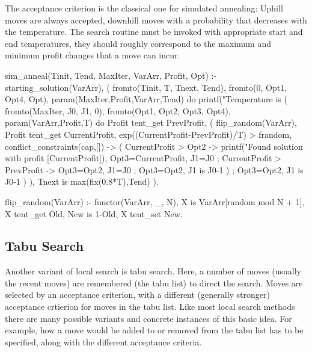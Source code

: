 The acceptance criterion is the classical one for simulated annealing:
Uphill moves are always accepted, downhill moves with a probability
that decreases with the temperature. The search routine must be invoked
with appropriate start and end temperatures, they should roughly correspond
to the maximum and minimum profit changes that a move can incur.
{\small
\begin{code}
sim_anneal(Tinit, Tend, MaxIter, VarArr, Profit, Opt) :-
        starting_solution(VarArr),              %
        (   fromto(Tinit, T, Tnext, Tend),
            fromto(0, Opt1, Opt4, Opt),
            param(MaxIter,Profit,VarArr,Tend)
        do
            printf("Temperature is %
            (    fromto(MaxIter, J0, J1, 0),
                fromto(Opt1, Opt2, Opt3, Opt4),
                param(VarArr,Profit,T)
            do
                Profit tent_get PrevProfit,
                (   flip_random(VarArr),        %
                    Profit tent_get CurrentProfit,
                    exp((CurrentProfit-PrevProfit)/T) > frandom,
                    conflict_constraints(cap,[])   %
                ->
                    ( CurrentProfit > Opt2 ->   %
                        printf("Found solution with profit %
                                    [CurrentProfit]),
                        Opt3=CurrentProfit,     %
                        J1=J0
                    ; CurrentProfit > PrevProfit ->
                        Opt3=Opt2, J1=J0        %
                    ;
                        Opt3=Opt2, J1 is J0-1   %
                    )
                ;
                    Opt3=Opt2, J1 is J0-1       %
                )
            ),
            Tnext is max(fix(0.8*T),Tend)
        ).

flip_random(VarArr) :-
        functor(VarArr, _, N),
        X is VarArr[random mod N + 1],
        X tent_get Old,
        New is 1-Old,
        X tent_set New.
\end{code}
}

\subsection{Tabu Search}
Another variant of local search is tabu search.  Here, a number of moves
(usually the recent moves) are remembered (the tabu list) to direct the
search. Moves are selected by an acceptance criterion, with a 
different (generally stronger) acceptance crtierion for moves in the tabu
list.  Like most local search methods there are many possible variants and
concrete instances of this basic idea. For example, how a move would be
added to or removed from the tabu list has to be specified, along with the
different acceptance criteria.

